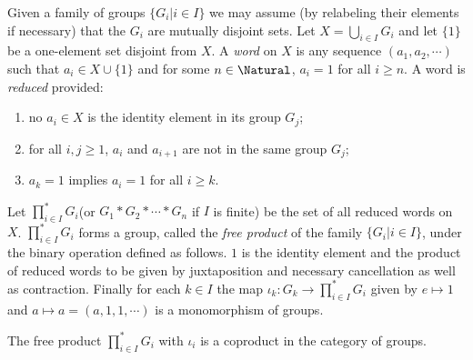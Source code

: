 \begin{Definition}
	Given a family of groups $ \{G_i|i \in I \} $ we may assume (by relabeling their elements if necessary) that the $ G_i $ are mutually disjoint sets. Let $ X=\bigcup_{i \in I} G_i $ and let $ \{1 \} $ be a one-element set disjoint from $ X $. A \textit{word} on $ X $ is any sequence $ (a_1,a_2,\cdots) $ such that $ a_i \in X \cup \{ 1\} $ and for some $ n \in \Natural $, $ a_i =1 $ for all $ i \geqslant n $. A word is \textit{reduced} provided:
	\begin{enumerate}
		\item no $ a_i \in X $ is the identity element in its group $ G_j $;
		\item for all $ i,j \geqslant 1 $, $ a_i $ and $ a_{i+1} $ are not in the same group $ G_j $;
		\item $ a_k=1 $ implies $ a_i=1 $ for all $ i \geqslant k $.
	\end{enumerate}
Let $ \prod_{i \in I}^{\ast}G_i $(or $ G_1 \ast G_2 \ast \cdots \ast G_n $ if $ I $ is finite) be the set of all reduced words on $ X $. $ \prod_{i \in I}^{\ast}G_i $ forms a group, called the \textit{free product} of the family $ \{G_i | i\in I \} $, under the binary operation defined as follows. $ 1 $ is the identity element and the product of reduced words to be given by juxtaposition and necessary cancellation as well as contraction. Finally for each $ k \in I $ the map $ \iota_k:G_k \to \prod_{i \in I}^{\ast}G_i $ given by $ e \mapsto 1 $ and $ a \mapsto a = (a,1,1,\cdots) $ is a monomorphism of groups.
\end{Definition}
\begin{Theorem}
	The free product $ \prod_{i \in I}^{\ast}G_i $ with $ \iota_i $ is a coproduct in the category of groups.
\end{Theorem}
